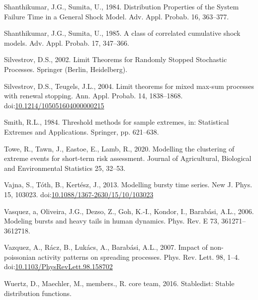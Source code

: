\documentclass[]{elsarticle} %
\begin{document}
\leavevmode\hypertarget{ref-Sumita1984}{}%
Shanthikumar, J.G., Sumita, U., 1984. Distribution Properties of the
System Failure Time in a General Shock Model. Adv. Appl. Probab. 16,
363--377.

\leavevmode\hypertarget{ref-Sumita1985}{}%
Shanthikumar, J.G., Sumita, U., 1985. A class of correlated cumulative
shock models. Adv. Appl. Probab. 17, 347--366.

\leavevmode\hypertarget{ref-Silvestrov2002a}{}%
Silvestrov, D.S., 2002. Limit Theorems for Randomly Stopped Stochastic
Processes. Springer (Berlin, Heidelberg).

\leavevmode\hypertarget{ref-ST04}{}%
Silvestrov, D.S., Teugels, J.L., 2004. Limit theorems for mixed max-sum
processes with renewal stopping. Ann. Appl. Probab. 14, 1838--1868.
doi:\href{https://doi.org/10.1214/105051604000000215}{10.1214/105051604000000215}

\leavevmode\hypertarget{ref-smith1984threshold}{}%
Smith, R.L., 1984. Threshold methods for sample extremes, in:
Statistical Extremes and Applications. Springer, pp. 621--638.

\leavevmode\hypertarget{ref-towe2020modelling}{}%
Towe, R., Tawn, J., Eastoe, E., Lamb, R., 2020. Modelling the clustering
of extreme events for short-term risk assessment. Journal of
Agricultural, Biological and Environmental Statistics 25, 32--53.

\leavevmode\hypertarget{ref-Vajna2013}{}%
Vajna, S., Tóth, B., Kertész, J., 2013. Modelling bursty time series.
New J. Phys. 15, 103023.
doi:\href{https://doi.org/10.1088/1367-2630/15/10/103023}{10.1088/1367-2630/15/10/103023}

\leavevmode\hypertarget{ref-Vasquez2006}{}%
Vasquez, a, Oliveira, J.G., Dezso, Z., Goh, K.-I., Kondor, I., Barabási,
A.L., 2006. Modeling bursts and heavy tails in human dynamics. Phys.
Rev. E 73, 361271--3612718.

\leavevmode\hypertarget{ref-Vazquez2007}{}%
Vazquez, A., Rácz, B., Lukács, A., Barabási, A.L., 2007. Impact of
non-poissonian activity patterns on spreading processes. Phys. Rev.
Lett. 98, 1--4.
doi:\href{https://doi.org/10.1103/PhysRevLett.98.158702}{10.1103/PhysRevLett.98.158702}

\leavevmode\hypertarget{ref-stabledist}{}%
Wuertz, D., Maechler, M., members., R. core team, 2016. Stabledist:
Stable distribution functions.
\end{document}
